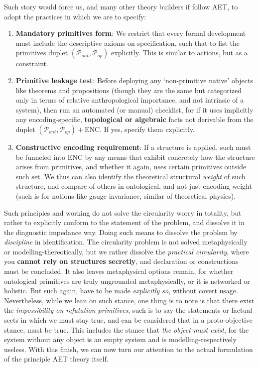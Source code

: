 Such story would force us, and many other theory builders if follow AET, to adopt the practices in which we are to specify: 
\begin{enumerate}[label=\roman*,topsep=1pt,itemsep=1pt]
	\item \textbf{Mandatory primitives form}: We restrict that every formal development must include the descriptive axioms on specification, such that to list the primitives duplet $(\mathcal{P}_{ont},\mathcal{P}_{op})$ explicitly. This is similar to \cite{rubio2022} actions, but as a constraint. 
	\item \textbf{Primitive leakage test}: Before deploying any `non-primitive native' objects like theorems and propositions (though they are the same but categorized only in terms of relative anthropological importance, and not intrinsic of a system), then run an automated (or manual) checklist, for if it uses implicitly any encoding-specific, \textbf{topological or algebraic} facts not derivable from the duplet $(\mathcal{P}_{ont},\mathcal{P}_{op})+\mathrm{ENC}$. If yes, specify them explicitly. 
	\item \textbf{Constructive encoding requirement}: If a structure is applied, such must be funneled into $\mathrm{ENC}$ by any means that exhibit concretely how the structure arises from primitives, and whether it again, uses certain primitives outside such set. We thus can also identify the theoretical structural \textit{weight} of such structure, and compare of others in ontological, and not just encoding weight (such is for notions like gauge invariance, similar of theoretical physics). 
\end{enumerate}
Such principles and working do not solve the circularity worry in totality, but rather to explicitly conform to the statement of the problem, and dissolve it in the diagnostic impedance way. Doing such means to dissolve the problem by \textit{discipline} in identification. The circularity problem is not solved metaphysically or modelling-thereotically, but we rather dissolve the \textit{practical circularity}, where you \textbf{cannot rely on structures secretly}, and declaration or constructions must be concluded. It also leaves metaphysical options remain, for whether ontological primitives are truly ungrounded metaphysically, or it is networked or holistic. But such again, have to be made \textit{explicitly so}, without covert usage. Nevertheless, while we lean on such stance, one thing is to note is that there exist the \textit{impossibility on refutation primitives}, such is to say the statements or factual sects in which we must stay true, and can be considered that in a proto-objective stance, must be true. This includes the stance that \textit{the object must exist}, for the system without any object is an empty system and is modelling-respectively useless. With this finish, we can now turn our attention to the actual formulation of the principle AET theory itself. 

